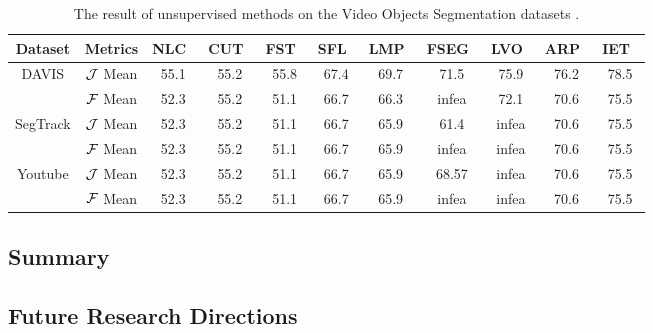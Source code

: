 \begin{table*}[t!h]
	\begin{center}
		\setlength\tabcolsep{3pt}
		\begin{tabular}{|c|c|c|c|c|c|c|c|c|c|c|}
			\hline
			Dataset& Metrics&NLC~\cite{Faktor2014Video} &CUT~\cite{Keuper2015Motion} &FST~\cite{Papazoglou2013Fast}
			&SFL~\cite{Cheng2017SegFlow:} &LMP~\cite{Tokmakov2017Learning} &FSEG~\cite{Jain2017FusionSeg} 
			&LVO~\cite{Tokmakov2017Learning} & ARP~\cite{Koh2017Primary} 
			&IET~\cite{Li2018Instance}\\
			\hline
			\multirow{2}{*}{DAVIS} &$\mathcal{J}$ Mean &55.1 &55.2 &55.8 &67.4 &69.7 &71.5 &75.9 &76.2 &78.5 \\
			\cline{2-11}
			&$\mathcal{F}$ Mean &52.3 &55.2 &51.1 &66.7 & 66.3 & infea &72.1 &70.6 &75.5 \\
			\hline
			\multirow{2}{*}{SegTrack} &$\mathcal{J}$ Mean &52.3 &55.2 &51.1 &66.7 &65.9 &61.4 & infea &70.6 &75.5 \\
			\cline{2-11}
			&$\mathcal{F}$ Mean &52.3 &55.2 &51.1 &66.7 &65.9 &infea &infea &70.6 &75.5 \\
			\hline

			\multirow{2}{*}{Youtube} &$\mathcal{J}$ Mean &52.3 &55.2 &51.1 &66.7 &65.9 &68.57 &infea &70.6 &75.5 \\
			\cline{2-11}
			&$\mathcal{F}$ Mean &52.3 &55.2 &51.1 &66.7 &65.9 &infea &infea &70.6 &75.5  \\
			\hline
		\end{tabular}
	\end{center}
	\caption{The result of unsupervised methods on the Video Objects Segmentation datasets .}
	\label{table:unsuperivsed_all_dataset}
\end{table*}
\subsection{Summary}

\subsection{Future Research Directions}